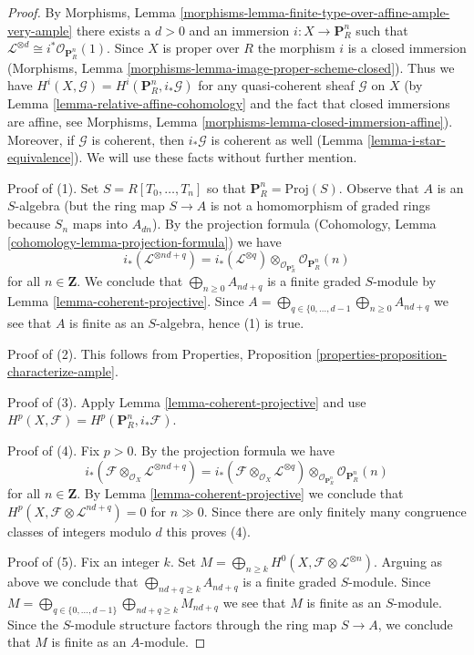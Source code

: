 \begin{proof}
By
Morphisms, Lemma \ref{morphisms-lemma-finite-type-over-affine-ample-very-ample}
there exists a $d > 0$ and an immersion $i : X \to \mathbf{P}^n_R$
such that $\mathcal{L}^{\otimes d} \cong i^*\mathcal{O}_{\mathbf{P}^n_R}(1)$.
Since $X$ is proper over $R$ the morphism $i$ is a closed immersion
(Morphisms, Lemma \ref{morphisms-lemma-image-proper-scheme-closed}).
Thus we have $H^i(X, \mathcal{G}) = H^i(\mathbf{P}^n_R, i_*\mathcal{G})$
for any quasi-coherent sheaf $\mathcal{G}$ on $X$
(by Lemma \ref{lemma-relative-affine-cohomology} and the fact that
closed immersions are affine, see
Morphisms, Lemma \ref{morphisms-lemma-closed-immersion-affine}).
Moreover, if $\mathcal{G}$ is coherent, then $i_*\mathcal{G}$
is coherent as well (Lemma \ref{lemma-i-star-equivalence}).
We will use these facts without further mention.

\medskip\noindent
Proof of (1). Set $S = R[T_0, \ldots, T_n]$ so that
$\mathbf{P}^n_R = \text{Proj}(S)$.
Observe that $A$ is an $S$-algebra (but the ring map $S \to A$ is not
a homomorphism of graded rings because $S_n$ maps into $A_{dn}$).
By the projection formula
(Cohomology, Lemma \ref{cohomology-lemma-projection-formula})
we have
$$
i_*(\mathcal{L}^{\otimes nd + q}) =
i_*(\mathcal{L}^{\otimes q})
\otimes_{\mathcal{O}_{\mathbf{P}^n_R}}
\mathcal{O}_{\mathbf{P}^n_R}(n)
$$
for all $n \in \mathbf{Z}$. We conclude that $\bigoplus_{n \geq 0} A_{nd + q}$
is a finite graded $S$-module by Lemma \ref{lemma-coherent-projective}.
Since
$A = \bigoplus_{q \in \{0, \ldots, d - 1} \bigoplus_{n \geq 0} A_{nd + q}$
we see that $A$ is finite as an $S$-algebra, hence (1) is true.

\medskip\noindent
Proof of (2). This follows from
Properties, Proposition \ref{properties-proposition-characterize-ample}.

\medskip\noindent
Proof of (3). Apply Lemma \ref{lemma-coherent-projective}
and use $H^p(X, \mathcal{F}) = H^p(\mathbf{P}^n_R, i_*\mathcal{F})$.

\medskip\noindent
Proof of (4). Fix $p > 0$. By the projection formula we have
$$
i_*(\mathcal{F} \otimes_{\mathcal{O}_X} \mathcal{L}^{\otimes nd + q}) =
i_*(\mathcal{F} \otimes_{\mathcal{O}_X} \mathcal{L}^{\otimes q})
\otimes_{\mathcal{O}_{\mathbf{P}^n_R}}
\mathcal{O}_{\mathbf{P}^n_R}(n)
$$
for all $n \in \mathbf{Z}$. By Lemma \ref{lemma-coherent-projective}
we conclude that $H^p(X, \mathcal{F} \otimes \mathcal{L}^{nd + q}) = 0$
for $n \gg 0$. Since there are only finitely many congruence classes
of integers modulo $d$ this proves (4).

\medskip\noindent
Proof of (5). Fix an integer $k$. Set
$M = \bigoplus_{n \geq k} H^0(X, \mathcal{F} \otimes \mathcal{L}^{\otimes n})$.
Arguing as above we conclude that $\bigoplus_{nd + q \geq k} A_{nd + q}$
is a finite graded $S$-module. Since
$M = \bigoplus_{q \in \{0, \ldots, d - 1\}}
\bigoplus_{nd + q \geq k} M_{nd + q}$
we see that $M$ is finite as an $S$-module. Since the $S$-module structure
factors through the ring map $S \to A$, we conclude that $M$ is finite
as an $A$-module.
\end{proof}

